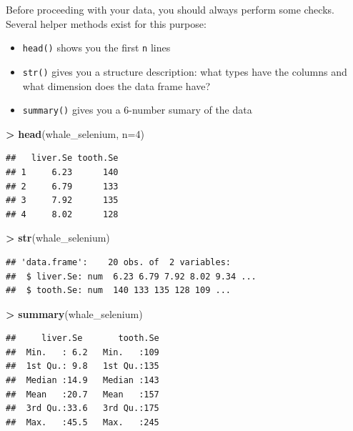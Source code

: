 \documentclass[]{book}
\newenvironment{Shaded}{\begin{snugshade}}{\end{snugshade}}
\newcommand{\DataTypeTok}[1]{\textcolor[rgb]{0.13,0.29,0.53}{#1}}
\newcommand{\DecValTok}[1]{\textcolor[rgb]{0.00,0.00,0.81}{#1}}
\newcommand{\KeywordTok}[1]{\textcolor[rgb]{0.13,0.29,0.53}{\textbf{#1}}}
\newcommand{\NormalTok}[1]{#1}
\newcommand{\OperatorTok}[1]{\textcolor[rgb]{0.81,0.36,0.00}{\textbf{#1}}}
\newcommand{\StringTok}[1]{\textcolor[rgb]{0.31,0.60,0.02}{#1}}
\providecommand{\tightlist}{%
  \setlength{\itemsep}{0pt}\setlength{\parskip}{0pt}}
\begin{document}
Before proceeding with your data, you should always perform some checks. Several helper methods exist for this purpose:

\begin{itemize}
\tightlist
\item
  \texttt{head()} shows you the first \texttt{n} lines
\item
  \texttt{str()} gives you a structure description: what types have the columns and what dimension does the data frame have?
\item
  \texttt{summary()} gives you a 6-number sumary of the data
\end{itemize}

\begin{Shaded}
\begin{Highlighting}[]
\OperatorTok{>}\StringTok{ }\KeywordTok{head}\NormalTok{(whale_selenium, }\DataTypeTok{n=}\DecValTok{4}\NormalTok{) }
\end{Highlighting}
\end{Shaded}

\begin{verbatim}
##   liver.Se tooth.Se
## 1     6.23      140
## 2     6.79      133
## 3     7.92      135
## 4     8.02      128
\end{verbatim}

\begin{Shaded}
\begin{Highlighting}[]
\OperatorTok{>}\StringTok{ }\KeywordTok{str}\NormalTok{(whale_selenium) }
\end{Highlighting}
\end{Shaded}

\begin{verbatim}
## 'data.frame':    20 obs. of  2 variables:
##  $ liver.Se: num  6.23 6.79 7.92 8.02 9.34 ...
##  $ tooth.Se: num  140 133 135 128 109 ...
\end{verbatim}

\begin{Shaded}
\begin{Highlighting}[]
\OperatorTok{>}\StringTok{ }\KeywordTok{summary}\NormalTok{(whale_selenium) }
\end{Highlighting}
\end{Shaded}

\begin{verbatim}
##     liver.Se       tooth.Se  
##  Min.   : 6.2   Min.   :109  
##  1st Qu.: 9.8   1st Qu.:135  
##  Median :14.9   Median :143  
##  Mean   :20.7   Mean   :157  
##  3rd Qu.:33.6   3rd Qu.:175  
##  Max.   :45.5   Max.   :245
\end{verbatim}
\end{document}
